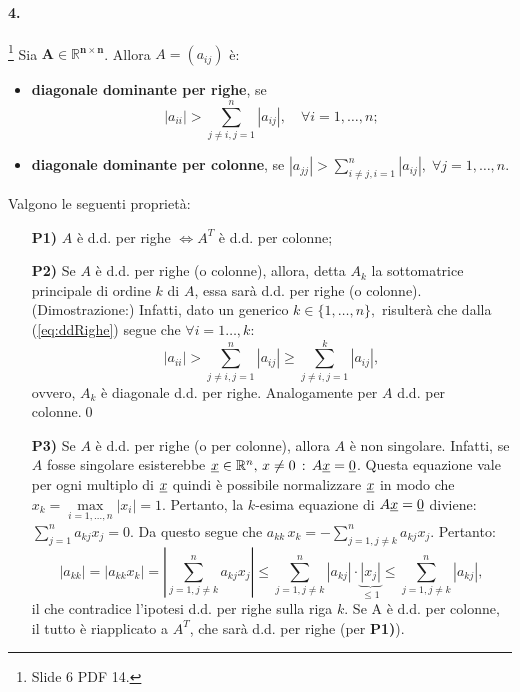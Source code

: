 \paragraph{4.}\footnote{Slide 6 PDF 14.} Sia $\boldsymbol{A\in\mathbb R^{n\times n}}$. Allora $A=(a_{ij})$ è:
\begin{itemize}
    \item \textbf{diagonale dominante per righe}, se
    \begin{equation}\label{eq:ddRighe}
        |a_{ii}|>\sum_{j\neq i, j=1}^n|a_{ij}|,\quad\forall i=1,\hdots,n;
    \end{equation}
    \item \textbf{diagonale dominante per colonne}, se $|a_{jj}|>\sum_{i\neq j, i=1}^n |a_{ij}|,\;\forall j=1,\hdots,n.$
\end{itemize}
Valgono le seguenti proprietà:
\begin{itemize}
    \item[\textbf{P1)}] $A$ è d.d. per righe $\iff A^T$ è d.d. per colonne;
    \item[\textbf{P2)}] Se $A$ è d.d. per righe (o colonne), allora, detta $A_k$ la sottomatrice principale di ordine $k$ di $A$, essa sarà d.d. per righe (o colonne). (Dimostrazione:) Infatti, dato un generico $k\in\{1,\hdots,n\},$ risulterà che dalla (\ref{eq:ddRighe}) segue che $\forall i=1\hdots,k:$
    \begin{equation*}
         |a_{ii}|>\sum_{j\neq i, j=1}^n|a_{ij}|\geq \sum_{j\neq i, j=1}^k|a_{ij}|,
    \end{equation*}
    ovvero, $A_k$ è diagonale d.d. per righe. Analogamente per $A$ d.d. per colonne.\qed
    \item[\textbf{P3)}] Se $A$ è d.d. per righe (o per colonne), allora $A$ è non singolare. Infatti, se $A$ fosse \gls{singolare} esisterebbe $\uline{x}\in\mathbb R^n,\, x\neq 0\,:\, A\uline{x}=\uline 0$. Questa equazione vale per ogni multiplo di $\uline x$ quindi è possibile normalizzare $\uline x$ in modo che $x_k=\underset{i=1,\hdots,n}{\max}|x_i|=1$. Pertanto, la $k$-esima equazione di $A\uline x=\uline 0$ diviene: $\sum_{j=1}^na_{kj}x_j=0.$ Da questo segue che $a_{kk}\,x_k=-\sum_{j=1,j\neq k}^n a_{kj}x_j.$ Pertanto:
    \begin{equation*}
        |a_{kk}|=|a_{kk}x_k|=\left|\sum_{j=1,j\neq k}^n a_{kj}x_j\right|\leq\sum_{j=1,j\neq k}^n |a_{kj}|\cdot\underbrace{|x_j|}_{\leq 1}\leq\sum_{j=1,j\neq k}^n |a_{kj}|,
    \end{equation*}
    il che contradice l'ipotesi d.d. per righe sulla riga $k$. Se A è d.d. per colonne, il tutto è riapplicato a $A^T$, che sarà d.d. per righe (per \textbf{P1)}).
\end{itemize}

